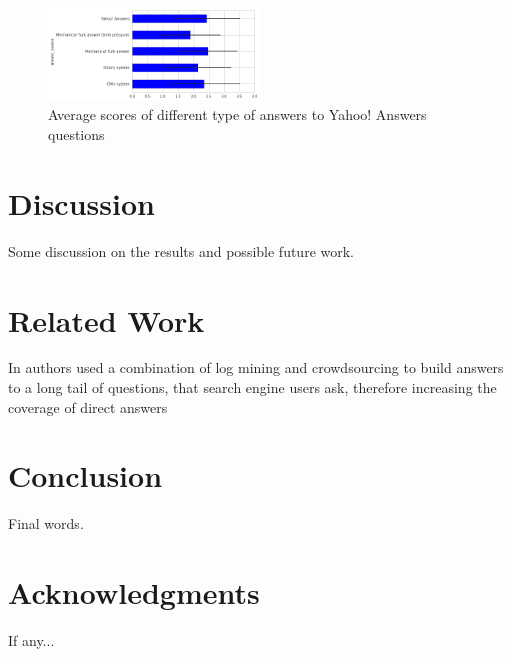 \documentclass[11pt,letterpaper]{article}
\begin{document}
\begin{figure}[h]
\centering
\includegraphics[width=0.5\textwidth]{img/average_score}
\caption{Average scores of different type of answers to Yahoo! Answers questions}
\label{fig:average_score}
\end{figure}

\section{Discussion}
\label{sec:discussion}

Some discussion on the results and possible future work.

\section{Related Work}
\label{sec:related_work}

In \cite{bernstein2012direct} authors used a combination of log mining and crowdsourcing to build answers to a long tail of questions, that search engine users ask, therefore increasing the coverage of direct answers

\section{Conclusion}
\label{sec:conclusion}

Final words.

\section*{Acknowledgments}

If any...



\end{document}
